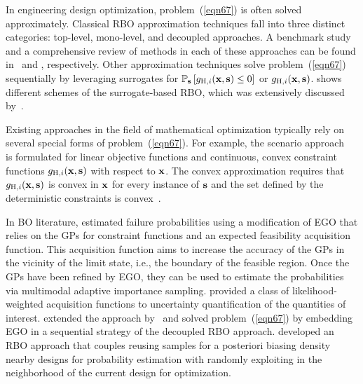 \documentclass[iicol,sn-basic]{sn-jnl}%
\begin{document}
In engineering design optimization, problem~(\ref{eqn67}) is often solved approximately.
Classical RBO approximation techniques fall into three distinct categories: top-level, mono-level, and decoupled approaches.
A benchmark study and a comprehensive review of methods in each of these approaches can be found in~\cite{Aoues2010} and \cite{Valdebenito2010}, respectively.
Other approximation techniques solve problem~(\ref{eqn67}) sequentially by leveraging surrogates for $\mathbb{P}_{\bf s}\left[g_{\text{H},i}({\bf x},{\bf s}) \leq 0\right]$ or $g_{\text{H},i}({\bf x},{\bf s})$.
 shows different schemes of the surrogate-based RBO, which was extensively discussed by~\cite{Moustapha2019}.  

Existing approaches in the field of mathematical optimization typically rely on several special forms of problem~(\ref{eqn67}).
For example, the scenario approach~\citep{Calafiore2006} is formulated for linear objective functions and continuous, convex constraint functions $g_{\text{H},i}({\bf x},{\bf s})$ with respect to ${\bf x}$.
The convex approximation requires that $g_{\text{H},i}({\bf x},{\bf s})$ is convex in ${\bf x}$ for every instance
of ${\bf s}$ and the set defined by the deterministic constraints is convex~\citep{Nemirovski2012}.

In BO literature, \cite{Bichon2008} estimated failure probabilities using a modification of EGO that relies on the GPs for constraint functions and an expected feasibility acquisition function.
This acquisition function aims to increase the accuracy of the GPs in the vicinity of the limit state, i.e., the boundary of the feasible region. 
Once the GPs have been refined by EGO, they can be used to estimate the probabilities via multimodal adaptive importance sampling.
\cite{Blanchard2021siamjuq} provided a class of likelihood-weighted acquisition functions to uncertainty quantification of the quantities of interest.
\cite{Huynh2023} extended the approach by~\cite{Bichon2008} and solved problem~(\ref{eqn67}) by embedding EGO in a sequential strategy of the decoupled RBO approach.
\cite{Chaudhuri2020} developed an RBO approach that couples reusing samples for a posteriori biasing density nearby designs for probability estimation with randomly exploiting in the neighborhood of the current design for optimization.
\end{document}
